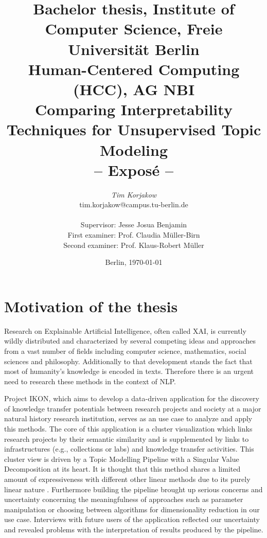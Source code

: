 \documentclass[pdftex,a4paper,12pt]{scrartcl}
\title{
{\small Bachelor thesis, Institute of Computer Science, Freie Universität Berlin}\\
{\small Human-Centered Computing (HCC), AG NBI}\\
[6ex]
{\LARGE Comparing Interpretability Techniques for Unsupervised Topic Modeling}\\
{\normalsize-- Exposé --}}
\author{
{\emph{\normalsize Tim Korjakow}}\\
{\normalsize tim.korjakow@campus.tu-berlin.de}\\\\
{\normalsize Supervisor: Jesse Josua Benjamin } \\
{\normalsize First examiner: Prof. Claudia Müller-Birn} \\
{\normalsize Second examiner: Prof. Klaus-Robert Müller } \\
}
\date{\normalsize Berlin, \today}
\newcommand{\blankpage}{
\newpage
\thispagestyle{empty}
\mbox{}
\newpage
}
\begin{document}
\maketitle 

\thispagestyle{empty}  %

\blankpage


\setcounter{page}{1} %

\section{Motivation of the thesis} 

Research on Explainable Artificial Intelligence, often called XAI, is currently wildly distributed and characterized by several competing ideas and approaches from a vast number of fields including computer science, mathematics, social sciences and philosophy. Additionally to that development stands the fact that most of humanity's knowledge is encoded in texts. Therefore there is an urgent need to research these methods in the context of NLP.

Project IKON, which aims to develop a data-driven application for the discovery of knowledge transfer potentials between research projects and society at a major natural history research institution, serves as an use case to analyze and apply this methods. The core of this application is a cluster visualization which links research projects by their semantic similarity and is supplemented by links to infrastructures (e.g., collections or labs) and knowledge transfer activities. This cluster view is driven by a Topic Modelling Pipeline with a Singular Value Decomposition at its heart. It is thought that this method shares a limited amount of expressiveness with different other linear methods due to its purely linear nature \cite{arrasWhatRelevantText2017}. Furthermore building the pipeline brought up serious concerns and uncertainty concerning the meaningfulness of approaches such as parameter manipulation or choosing between algorithms for dimensionality reduction \cite{benjaminTransparencyMediationMeaning2018} in our use case. Interviews with future users of the application reflected our uncertainty and revealed problems with the interpretation of results produced by the pipeline.
\end{document}
